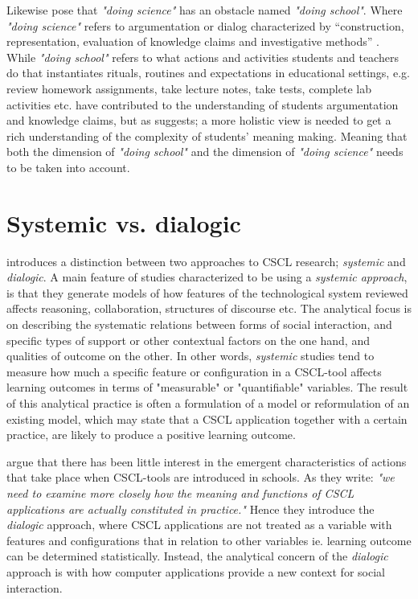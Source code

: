Likewise \citet{jimenez2000doing} pose that \emph{"doing science"} has an obstacle named \emph{"doing school"}. Where \emph{"doing science"} refers to argumentation or dialog characterized by “construction, representation, evaluation of knowledge claims and investigative methods” \citep{jimenez2000doing}. While \emph{"doing school"} refers to what actions and activities students and teachers do that instantiates rituals, routines and expectations in educational settings, e.g. review homework assignments, take lecture notes, take tests, complete lab activities etc. \citeauthor{jimenez2000doing} have contributed to the understanding of students argumentation and knowledge claims, but as \citet*{furberg2008students} suggests; a more holistic view is needed to get a rich understanding of the complexity of students' meaning making. Meaning that both the dimension of \emph{"doing school"} and the dimension of \emph{"doing science"} needs to be taken into account. 

\section{Systemic vs. dialogic}
\citet{arnseth2006approaching} introduces a distinction between two approaches to CSCL research; \emph{systemic} and \emph{dialogic}. A main feature of studies characterized to be using a \emph{systemic approach}, is that they generate models of how features of the technological system reviewed affects reasoning, collaboration, structures of discourse etc. The analytical focus is on describing the systematic relations between forms of social interaction, and specific types of support or other contextual factors on the one hand, and qualities of outcome on the other. \citep{arnseth2006approaching} In other words, \emph{systemic} studies tend to measure how much a specific feature or configuration in a CSCL-tool affects learning outcomes in terms of "measurable" or "quantifiable" variables. The result of this analytical practice is often a formulation of a model or reformulation of an existing model, which may state that a CSCL application together with a certain practice, are likely to produce a positive learning outcome.

\citeauthor*{arnseth2006approaching} argue that there has been little interest in the emergent characteristics of actions that take place when CSCL-tools are introduced in schools. As they write: \emph{"we need to examine more closely how the meaning and functions of CSCL applications are actually constituted in practice."} \citep[p. 181]{arnseth2006approaching} Hence they introduce the \emph{dialogic} approach, where CSCL applications are not treated as a variable with features and configurations that in relation to other variables ie. learning outcome can be determined statistically. Instead, the analytical concern  of the \emph{dialogic} approach is with how computer applications provide a new context for social interaction.
